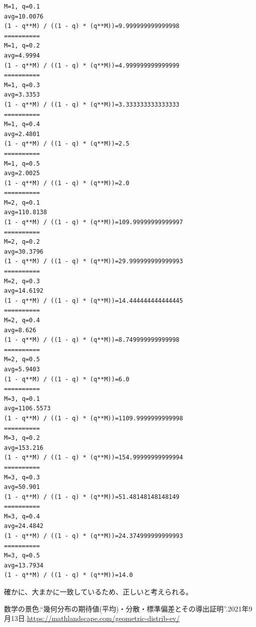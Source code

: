 \documentclass[a4paper, 10pt, dvipdfmx]{jlreq}
\begin{document}
\begin{lstlisting}[caption=実験結果, label=code:実験結果]
M=1, q=0.1
avg=10.0076
(1 - q**M) / ((1 - q) * (q**M))=9.999999999999998
==========
M=1, q=0.2
avg=4.9994
(1 - q**M) / ((1 - q) * (q**M))=4.999999999999999
==========
M=1, q=0.3
avg=3.3353
(1 - q**M) / ((1 - q) * (q**M))=3.333333333333333
==========
M=1, q=0.4
avg=2.4801
(1 - q**M) / ((1 - q) * (q**M))=2.5
==========
M=1, q=0.5
avg=2.0025
(1 - q**M) / ((1 - q) * (q**M))=2.0
==========
M=2, q=0.1
avg=110.8138
(1 - q**M) / ((1 - q) * (q**M))=109.99999999999997
==========
M=2, q=0.2
avg=30.3796
(1 - q**M) / ((1 - q) * (q**M))=29.999999999999993
==========
M=2, q=0.3
avg=14.6192
(1 - q**M) / ((1 - q) * (q**M))=14.444444444444445
==========
M=2, q=0.4
avg=8.626
(1 - q**M) / ((1 - q) * (q**M))=8.749999999999998
==========
M=2, q=0.5
avg=5.9403
(1 - q**M) / ((1 - q) * (q**M))=6.0
==========
M=3, q=0.1
avg=1106.5573
(1 - q**M) / ((1 - q) * (q**M))=1109.9999999999998
==========
M=3, q=0.2
avg=153.216
(1 - q**M) / ((1 - q) * (q**M))=154.99999999999994
==========
M=3, q=0.3
avg=50.901
(1 - q**M) / ((1 - q) * (q**M))=51.48148148148149
==========
M=3, q=0.4
avg=24.4842
(1 - q**M) / ((1 - q) * (q**M))=24.374999999999993
==========
M=3, q=0.5
avg=13.7934
(1 - q**M) / ((1 - q) * (q**M))=14.0
\end{lstlisting}

確かに、大まかに一致しているため、正しいと考えられる。

\begin{thebibliography}{9}
    数学の景色.“幾何分布の期待値(平均)・分散・標準偏差とその導出証明”.2021年9月13日.\url{https://mathlandscape.com/geometric-distrib-ev/}
\end{thebibliography}
\end{document}
